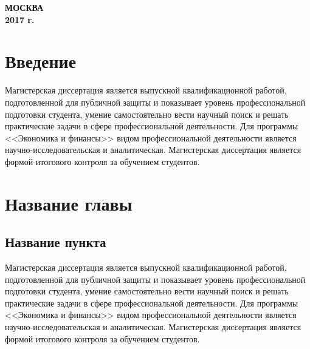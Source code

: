\documentclass[12pt,a4paper, oneside]{extreport}
\begin{document}
\hfill{}

%
%

\vfill

\begin{center}
\normalsize \bfseries МОСКВА \\ 2017 г.
\end{center}





\tableofcontents  %



\chapter*{Введение}


Магистерская диссертация является выпускной квалификационной работой, подготовленной для публичной защиты и показывает уровень профессиональной подготовки студента, умение самостоятельно вести научный поиск и решать практические задачи в сфере профессиональной деятельности. Для программы <<Экономика и финансы>> видом профессиональной деятельности является научно-исследовательская и аналитическая. Магистерская диссертация является формой итогового контроля за обучением студентов.


\chapter{Название главы}

\section{Название пункта}

Магистерская диссертация является выпускной квалификационной работой, подготовленной для публичной защиты и показывает уровень профессиональной подготовки студента, умение самостоятельно вести научный поиск и решать практические задачи в сфере профессиональной деятельности. Для программы <<Экономика и финансы>> видом профессиональной деятельности является научно-исследовательская и аналитическая. Магистерская диссертация является формой итогового контроля за обучением студентов.
\end{document}
